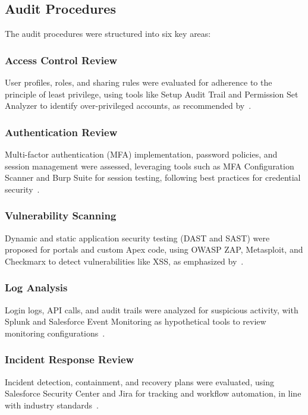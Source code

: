\documentclass[12pt,a4paper]{article}
\begin{document}
\subsection{Audit Procedures}
The audit procedures were structured into six key areas:

\subsubsection{Access Control Review}
User profiles, roles, and sharing rules were evaluated for adherence to the principle of least privilege, using tools like Setup Audit Trail and Permission Set Analyzer to identify over-privileged accounts, as recommended by~\cite{onilab2024}.

\subsubsection{Authentication Review}
Multi-factor authentication (MFA) implementation, password policies, and session management were assessed, leveraging tools such as MFA Configuration Scanner and Burp Suite for session testing, following best practices for credential security~\cite{foundhq2025}.

\subsubsection{Vulnerability Scanning}
Dynamic and static application security testing (DAST and SAST) were proposed for portals and custom Apex code, using OWASP ZAP, Metasploit, and Checkmarx to detect vulnerabilities like XSS, as emphasized by~\cite{capstorm2023}.

\subsubsection{Log Analysis}
Login logs, API calls, and audit trails were analyzed for suspicious activity, with Splunk and Salesforce Event Monitoring as hypothetical tools to review monitoring configurations~\cite{sonar2025}.

\subsubsection{Incident Response Review}
Incident detection, containment, and recovery plans were evaluated, using Salesforce Security Center and Jira for tracking and workflow automation, in line with industry standards~\cite{onilab2024}.
\end{document}
